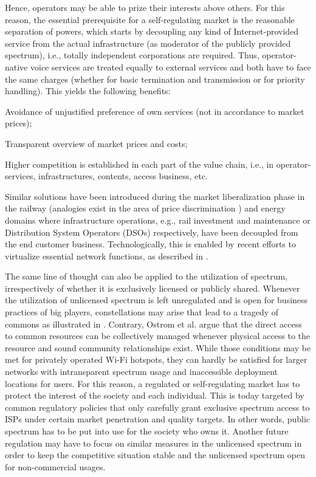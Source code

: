 \documentclass[conference]{IEEEtran}
\begin{document}
Hence, operators may be able to prize their interests above others. For this reason, the essential prerequisite for a self-regulating market is the reasonable separation of powers, which starts by decoupling any kind of Internet-provided service from the actual infrastructure (as moderator of the publicly provided spectrum), i.e., totally independent corporations are required. Thus, operator-native voice services are treated equally to external services and both have to face the same charges (whether for basic termination and transmission or for priority handling). This yields the following benefits: 
\begin{inparaenum}
	\item Avoidance of unjustified preference of own services (not in accordance to market prices);
	\item Transparent overview of market prices and costs;
	\item Higher competition is established in each part of the value chain, i.e.,  in operator-services, infrastructures, contents, access business, etc.
\end{inparaenum}



Similar solutions have been introduced during the market liberalization phase in the railway (analogies exist in the area of price discrimination \cite{Odlyzko:2012tz}) and energy domains where infrastructure operations, e.g., rail investment and maintenance or Distribution System Operators (DSOs) respectively, have been decoupled from the end customer business. Technologically, this is enabled by recent efforts to virtualize essential network functions, as described in \cite{forde2011exclusive}.



	The same line of thought can also be applied to the utilization of spectrum, irrespectively of whether it is exclusively licensed or publicly shared. Whenever the utilization of unlicensed spectrum is left unregulated and is open for business practices of big players, constellations may arise that lead to a tragedy of commons \cite{hardin1968tragedy} as illustrated in \cite{zwickl2013wi}. Contrary, Ostrom et al. \cite{ostrom1999revisiting} argue that the direct access to common resources can be collectively managed whenever physical access to the resource and sound community relationships exist. While those conditions may be met for privately operated Wi-Fi hotspots, they can hardly be satisfied for larger networks with intransparent spectrum usage and inaccessible deployment locations for users.  For this reason, a regulated or self-regulating market has to protect the interest of the society and each individual. This is today targeted by common regulatory policies that only carefully grant exclusive spectrum access to ISPs under certain market penetration and quality targets. In other words, public spectrum has to be put into use for the society who owns it.	Another future regulation may have to focus on similar measures in the unlicensed spectrum in order to keep the competitive situation stable and the unlicensed spectrum open for non-commercial usages.
\end{document}
